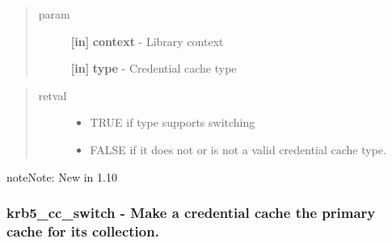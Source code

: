 \documentclass[letterpaper,10pt,english]{sphinxmanual}
\begin{document}
\begin{fulllineitems}
\label{appdev/refs/api/krb5_cc_support_switch:c.krb5_cc_support_switch}
\end{fulllineitems}

\begin{quote}\begin{description}
\item[{param}] \leavevmode
\textbf{{[}in{]}} \textbf{context} - Library context

\textbf{{[}in{]}} \textbf{type} - Credential cache type

\end{description}\end{quote}
\begin{quote}\begin{description}
\item[{retval}] \leavevmode\begin{itemize}
\item {} 
TRUE   if type supports switching

\item {} 
FALSE   if it does not or is not a valid credential cache type.

\end{itemize}

\end{description}\end{quote}

\begin{notice}{note}{Note:}
New in 1.10
\end{notice}


\subsubsection{krb5\_cc\_switch -  Make a credential cache the primary cache for its collection.}
\label{appdev/refs/api/krb5_cc_switch::doc}\label{appdev/refs/api/krb5_cc_switch:krb5-cc-switch-make-a-credential-cache-the-primary-cache-for-its-collection}

\begin{fulllineitems}
\label{appdev/refs/api/krb5_cc_switch:c.krb5_cc_switch}
\end{fulllineitems}
\end{document}
